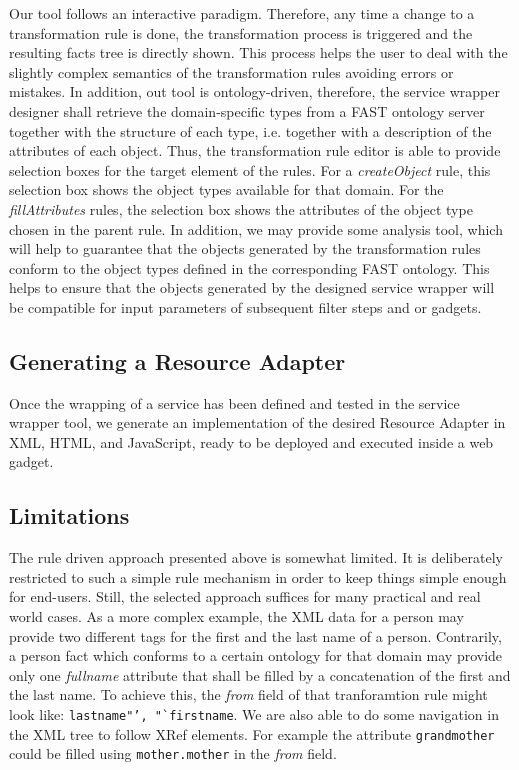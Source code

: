 Our tool follows an interactive paradigm. Therefore, any time a change to a transformation rule is done, the transformation process is triggered and the resulting facts tree is directly shown. This process helps the user to deal with the slightly complex semantics of the transformation rules avoiding errors or mistakes. In addition, out tool is ontology-driven, therefore, the service wrapper designer shall retrieve the domain-specific types from a FAST ontology server together with the structure of each type, i.e. together with a description of the attributes of each object. Thus, the transformation rule editor is able to provide selection boxes for the target element of the rules. For a \emph{createObject} rule, this selection box shows the object types available for that domain. For the \emph{fillAttributes} rules, the selection box shows the attributes of the object type chosen in the parent rule. In addition, we may provide some analysis tool, which will help to guarantee that the objects generated by the transformation rules conform to the object types defined in the corresponding FAST ontology. This helps to ensure that the objects generated by the designed service wrapper will be compatible for input parameters of subsequent filter steps and or gadgets.



\subsection{Generating a Resource Adapter} %
\label{sub:generating_a_resource_adapter}

Once the wrapping of a service has been defined and tested in the service wrapper tool, we generate an implementation of the desired Resource Adapter in XML, HTML, and JavaScript, ready to be deployed and executed inside a web gadget. 


\subsection{Limitations} %
\label{sub:limitations}

The rule driven approach presented above is somewhat limited. It is deliberately restricted to such a simple rule mechanism in order to keep things simple enough for end-users. Still, the selected approach suffices for many practical and real world cases. As a more complex example, the XML data for a person may provide two different tags for the first and the last name of a person. Contrarily, a person fact which conforms to a certain ontology for that domain may provide only one \emph{fullname} attribute that shall be filled by a concatenation of the first and the last name. To achieve this, the \textit{from} field of that tranforamtion rule might look like: \texttt{lastname"', "`firstname}. We are also able to do some navigation in the XML tree to follow XRef elements. For example the attribute \texttt{grandmother} could be filled using \texttt{mother.mother} in the \textit{from} field. 

